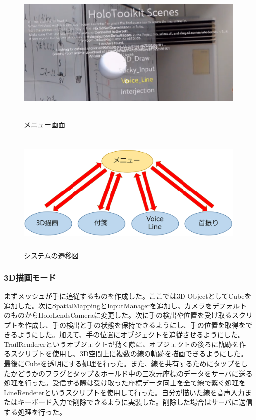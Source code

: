 \documentclass[11pt,a4j, titlepage]{jarticle} %
\begin{document}
\begin{figure}[H]
  \begin{center}
    \includegraphics[clip,height=7.0cm,width=12.0cm]{./scenelauncher.eps}
    \caption{メニュー画面}
    \label{fig:scenelauncher}
  \end{center}
\end{figure}

\begin{figure}[H]
  \begin{center}
    \includegraphics[clip,height=6.0cm,width=12.0cm]{./senizu.eps}
    \caption{システムの遷移図}
    \label{fig:senizu}
  \end{center}
\end{figure}

\subsubsection{3D描画モード}
まずメッシュが手に追従するものを作成した。ここでは3D ObjectとしてCubeを追加した。次にSpatialMappingとInputManagerを追加し、カメラをデフォルトのものからHoloLendsCameraに変更した。次に手の検出や位置を受け取るスクリプトを作成し、手の検出と手の状態を保持できるようにし、手の位置を取得をできるようにした。加えて、手の位置にオブジェクトを追従させるようにした。TrailRenderer\cite{trailrenderer}というオブジェクトが動く際に、オブジェクトの後ろに軌跡を作るスクリプトを使用し、3D空間上に複数の線の軌跡を描画できるようにした。最後にCubeを透明にする処理を行った。また、線を共有するためにタップをしたかどうかのフラグとタップ＆ホールド中の三次元座標のデータをサーバに送る処理を行った。受信する際は受け取った座標データ同士を全て線で繋ぐ処理をLineRenderer\cite{linerenderer}というスクリプトを使用して行った。自分が描いた線を音声入力またはキーボード入力で削除できるように実装した。削除した場合はサーバに送信する処理を行った。
\end{document}
